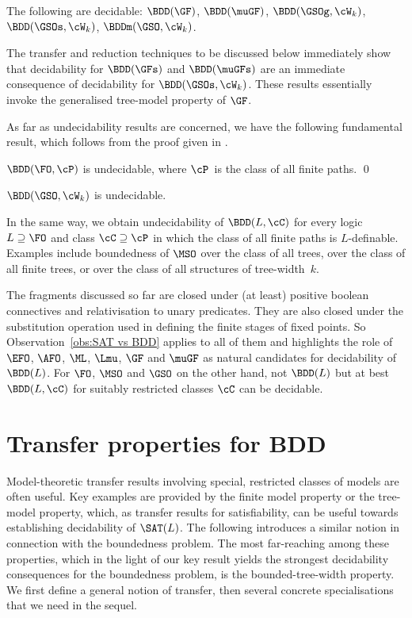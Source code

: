 \documentclass{LMCS}
\begin{document}
\begin{thm}\label{thm:GFmuGF}
The following are decidable\?:
$\BDD(\GF)$, $\BDD(\muGF)$, $\BDD(\GSOg,\cW_k)$,
$\BDD(\GSOs,\cW_k)$, $\BDDm(\GSO,\cW_k)$.
\end{thm}

The transfer and reduction techniques to be discussed below
immediately show that decidability for $\BDD(\GFs)$ and
$\BDD(\muGFs)$ are an immediate
consequence of decidability for $\BDD(\GSOs,\cW_k)$.
These results essentially invoke the generalised tree-model
property of $\GF$. 

As far as undecidability results are concerned,
we have the following fundamental result,
which follows from the proof given in \cite{GaifmanMaSaVa93}.
\begin{thm}\label{thm:FOundec}
$\BDD(\FO,\cP)$ is undecidable,
where $\cP$~is the class of all finite paths.
\qed\end{thm}
\begin{cor}
$\BDD(\GSO,\cW_k)$ is undecidable.
\end{cor}
In the same way, we obtain undecidability of $\BDD(L,\cC)$
for every logic $L \supseteq \FO$ and class $\cC \supseteq \cP$
in which the class of all finite paths is $L$-definable.
Examples include boundedness of $\MSO$ over the class of all trees, over
the class of all finite trees, or over the class of all structures
of tree-width~$k$.

\medskip
The fragments discussed so far are closed under (at least)
positive boolean connectives and relativisation to unary
predicates. They are also closed under the substitution
operation used in defining the finite stages of fixed points.
So Observation~\ref{obs:SAT vs BDD}
applies to all of them and highlights the role of
$\EFO$, $\AFO$, $\ML$, $\Lmu$, $\GF$ and $\muGF$ as natural candidates
for decidability of $\BDD(L)$.
For $\FO$, $\MSO$ and $\GSO$ on the other hand,
not $\BDD(L)$ but at best
$\BDD(L,\cC)$ for suitably restricted classes $\cC$
can be decidable.


\section{Transfer properties for BDD}
\label{sect:transfer}

Model-theoretic transfer results involving special, restricted classes
of models are often useful. Key examples are provided by
the finite model property or the tree-model property, which, as
transfer results for satisfiability, can be useful
towards establishing decidability of $\SAT(L)$. The following
introduces a similar notion in connection with the boundedness
problem. The most far-reaching among these properties, which in the light
of our key result yields the strongest decidability consequences
for the boundedness problem, is the bounded-tree-width property.
We first define a general notion of transfer, then several
concrete specialisations that we need in the sequel.
\end{document}
